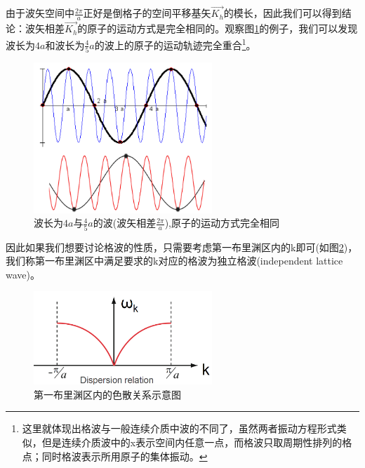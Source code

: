 \documentclass{ctexart}
\begin{document}
            由于波矢空间中$\frac{2\pi}{a}$正好是倒格子的空间平移基矢$\vec{K_h}$的模长，因此我们可以得到结论：波矢相差$\vec{K_h}$的原子的运动方式是完全相同的。观察图\ref{fig:independentlatticewave}的例子，我们可以发现波长为$4a$和波长为$\frac{4}{5}a$的波上的原子的运动轨迹完全重合\footnote{ 这里就体现出格波与一般连续介质中波的不同了，虽然两者振动方程形式类似，但是连续介质波中的x表示空间内任意一点，而格波只取周期性排列的格点；同时格波表示所用原子的集体振动。}。
            \begin{figure}[H]
                \centering
                \includegraphics[width=0.6\textwidth]{figure/独立格波.png}
                \caption{波长为$4a$与$\frac{4}{5}a$的波(波矢相差$\frac{2\pi}{a}$),原子的运动方式完全相同}
                \label{fig:independentlatticewave}
            \end{figure}
            
           因此如果我们想要讨论格波的性质，只需要考虑第一布里渊区内的k即可(如图\ref{fig:dispertionrelationin1stBZ})，我们称第一布里渊区中满足要求的k对应的格波为独立格波(independent lattice wave)。
            \begin{figure}[H]
                \centering
                \includegraphics[width=0.6\textwidth]{figure/第一布里渊区内的色散关系.png}
                \caption{第一布里渊区内的色散关系示意图}
                \label{fig:dispertionrelationin1stBZ}
            \end{figure}
            
\end{document}
